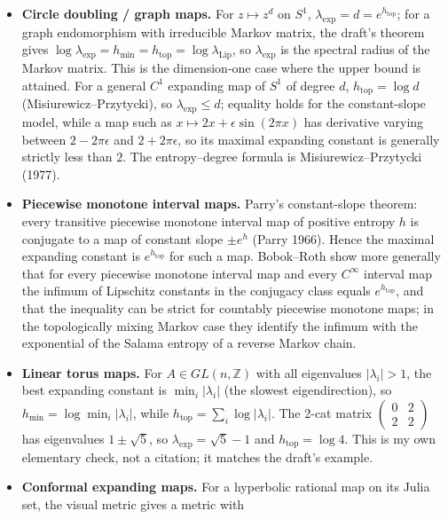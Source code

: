\documentclass[
]{article}
\providecommand{\tightlist}{%
  \setlength{\itemsep}{0pt}\setlength{\parskip}{0pt}}
\begin{document}
\begin{itemize}
\tightlist
\item
  \textbf{Circle doubling / graph maps.} For \(z\mapsto z^d\) on
  \(S^1\), \(\lambda_{\exp}=d=e^{h_{\mathrm{top}}}\); for a graph
  endomorphism with irreducible Markov matrix, the draft's theorem gives
  \(\log\lambda_{\exp}=h_{\min}=h_{\mathrm{top}}=\log\lambda_{\mathrm{Lip}}\),
  so \(\lambda_{\exp}\) is the spectral radius of the Markov matrix.
  This is the dimension-one case where the upper bound is attained. For
  a general \(C^1\) expanding map of \(S^1\) of degree \(d\),
  \(h_{\mathrm{top}}=\log d\) (Misiurewicz--Przytycki), so
  \(\lambda_{\exp}\le d\); equality holds for the constant-slope model,
  while a map such as \(x\mapsto 2x+\epsilon\sin(2\pi x)\) has
  derivative varying between \(2-2\pi\epsilon\) and \(2+2\pi\epsilon\),
  so its maximal expanding constant is generally strictly less than
  \(2\). The entropy--degree formula is Misiurewicz--Przytycki (1977).
\item
  \textbf{Piecewise monotone interval maps.} Parry's constant-slope
  theorem: every transitive piecewise monotone interval map of positive
  entropy \(h\) is conjugate to a map of constant slope \(\pm e^h\)
  (Parry 1966). Hence the maximal expanding constant is
  \(e^{h_{\mathrm{top}}}\) for such a map. Bobok--Roth show more
  generally that for every piecewise monotone interval map and every
  \(C^\infty\) interval map the infimum of Lipschitz constants in the
  conjugacy class equals \(e^{h_{\mathrm{top}}}\), and that the
  inequality can be strict for countably piecewise monotone maps; in the
  topologically mixing Markov case they identify the infimum with the
  exponential of the Salama entropy of a reverse Markov chain.
\item
  \textbf{Linear torus maps.} For \(A\in GL(n,\mathbb Z)\) with all
  eigenvalues \(|\lambda_i|>1\), the best expanding constant is
  \(\min_i|\lambda_i|\) (the slowest eigendirection), so
  \(h_{\min}=\log\min_i|\lambda_i|\), while
  \(h_{\mathrm{top}}=\sum_i\log|\lambda_i|\). The 2-cat matrix
  \(\begin{pmatrix}0&2\\2&2\end{pmatrix}\) has eigenvalues
  \(1\pm\sqrt5\), so \(\lambda_{\exp}=\sqrt5-1\) and
  \(h_{\mathrm{top}}=\log4\). This is my own elementary check, not a
  citation; it matches the draft's example.
\item
  \textbf{Conformal expanding maps.} For a hyperbolic rational map on
  its Julia set, the visual metric gives a metric with

\end{itemize}
\end{document}
